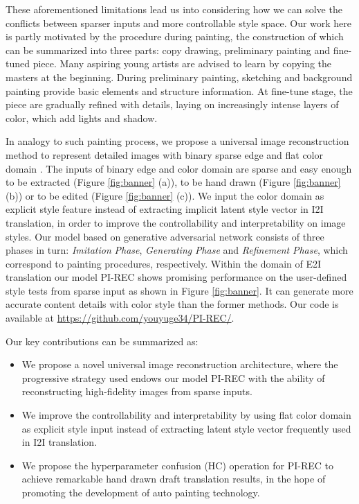 \documentclass[10pt,twocolumn,letterpaper]{article} \usepackage{amsfonts,amssymb}
\begin{document}
These aforementioned limitations lead us into con\-si\-de\-ring how we can solve the conflicts between sparser inputs and more controllable style space. Our work here is partly motivated by the procedure during painting, the construction of which can be summarized into three parts: copy drawing, preliminary painting and fine-tuned piece. Many aspiring young artists are advised to learn by copying the masters at the beginning. During preliminary painting, sketching and background painting provide basic elements and structure information. At fine-tune stage, the piece are gradually refined with details, laying on increasingly intense layers of color, which add lights and shadow.

In analogy to such painting process, we propose a universal image reconstruction method to represent detailed images with binary sparse edge and flat color domain \cite{jo2019sc}. The inputs of binary edge and color domain are sparse and easy enough to be extracted (Figure \ref{fig:banner} (a)), to be hand drawn (Figure \ref{fig:banner} (b)) or to be edited (Figure \ref{fig:banner} (c)). We input the color domain as explicit style feature instead of extracting implicit latent style vector in I2I translation, in order to improve the controllability and interpretability on image styles. Our model based on generative adversarial network consists of three phases in turn: \emph{Imitation} \emph{Phase}, \emph{Generating} \emph{Phase} and \emph{Refinement} \emph{Phase}, which correspond to painting procedures, respectively. Within the domain of E2I translation our model PI-REC shows promi\-sing performance on the user-defined style tests from sparse input as shown in Figure \ref{fig:banner}. It can generate more accurate content details with color style than the former methods. Our code is available at \url{https://github.com/youyuge34/PI-REC/}.

Our key contributions can be summarized as:
\begin{itemize}
\item
We propose a novel universal image reconstruction architecture, where the progressive strategy used endows our model PI-REC with the ability of reconstructing high-fidelity images from sparse inputs.
\item
We improve the controllability and interpretability by using flat color domain as explicit style input instead of extracting latent style vector frequently used in I2I translation.
\item
We propose the hyperparameter confusion (HC) ope\-ra\-tion for PI-REC to achieve remarkable hand drawn draft translation results, in the hope of promoting the development of auto painting technology.
\end{itemize}
\end{document}
